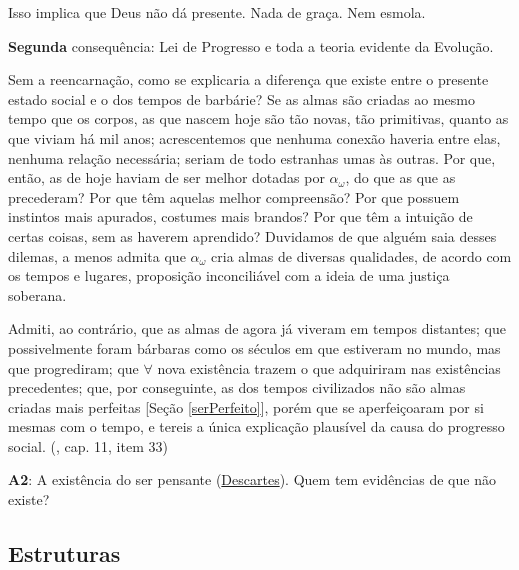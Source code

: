 \documentclass[12pt,a4paper]{article}
\begin{document}
			Isso implica que Deus n\~ao d\'a presente. Nada de gra\c{c}a. Nem esmola.

			\begin{flushright}
			\end{flushright}

			\textbf{Segunda} consequ\^encia: Lei de Progresso e toda a teoria evidente\cite{evidencias} da Evolu\c{c}\~ao.

			Sem a reencarna\c{c}\~ao, como se explicaria a diferen\c{c}a que existe entre o presente estado social\cite{social} e o dos tempos de barb\'arie? Se as almas s\~ao criadas ao mesmo tempo\cite{tempo} que os corpos\cite{demonismo}, as que nascem hoje s\~ao t\~ao novas, t\~ao primitivas, quanto as que viviam h\'a mil anos; acrescentemos que nenhuma conex\~ao haveria entre elas, nenhuma rela\c{c}\~ao necess\'aria; seriam de todo estranhas umas \`as outras. Por que, ent\~ao, as de hoje haviam de ser melhor dotadas por $ \alpha_\omega $, do que as que as precederam? Por que t\^em aquelas melhor compreens\~ao? Por que possuem instintos mais apurados, costumes mais brandos? Por que t\^em a intui\c{c}\~ao de certas coisas, sem as haverem aprendido? Duvidamos de que algu\'em saia desses dilemas, a menos admita que $ \alpha_\omega $ cria almas de diversas qualidades, de acordo com os tempos e lugares, proposi\c{c}\~ao inconcili\'avel com a ideia de uma justi\c{c}a soberana.

			Admiti, ao contr\'ario, que as almas de agora j\'a viveram em tempos distantes; que possivelmente foram b\'arbaras como os s\'eculos em que estiveram no mundo, mas que progrediram; que $\forall$ nova exist\^encia trazem o que adquiriram nas exist\^encias precedentes; que, por conseguinte, as dos tempos civilizados n\~ao s\~ao almas criadas mais perfeitas [Se\c{c}\~ao \ref{serPerfeito}], por\'em que se aperfei\c{c}oaram por si mesmas com o tempo, e tereis a \'unica explica\c{c}\~ao plaus\'ivel da causa do progresso social\cite{social}. (\cite{genese}, cap. 11, item 33)

			\begin{flushright}
			\end{flushright}

            \textbf{A2}: A exist\^encia do ser pensante (\href{http://pt.wikipedia.org/wiki/Ren\%C3\%A9_Descartes}{Descartes}). Quem tem evid\^encias\cite{evidencias} de que n\~ao existe?

		\subsection{Estruturas}\label{estruturas}
\end{document}
